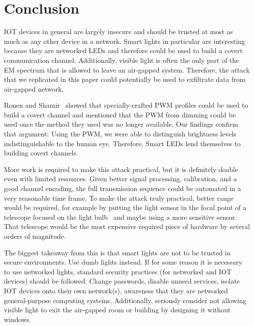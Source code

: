 \section{Conclusion} %
\label{sec:conclusion}

IOT devices in general are largely insecure and should be trusted at most as much as any other device in a network.
Smart lights in particular are interesting because they are networked LEDs and therefore could be used to build a covert communication channel.
Additionally, visible light is often the only part of the EM spectrum that is allowed to leave an air-gapped system.
Therefore, the attack that we replicated in this paper could potentially be used to exfiltrate data from air-gapped network.

Ronen and Shamir~\cite{Ronen:2016:EFAIDCSL} showed that specially-crafted PWM profiles could be used to build a covert channel and mentioned that the PWM from dimming could be used once the method they used was no longer available.
Our findings confirm that argument: Using the PWM, we were able to distinguish brightness levels indistinguishable to the human eye.
Therefore, Smart LEDs lend themselves to building covert channels.

More work is required to make this attack practical, but it is definitely doable even with limited resources.
Given better signal processing, calibration, and a good channel encoding, the full transmission sequence could be automated in a very reasonable time frame.
To make the attack truly practical, better range would be required, for example by putting the light sensor in the focal point of a telescope focused on the light bulb~\cite{Ronen:2016:EFAIDCSL} and maybe using a more sensitive sensor.
That telescope would be the most expensive required piece of hardware by several orders of magnitude.

The biggest takeaway from this is that smart lights are not to be trusted in secure environments. Use dumb lights instead.
If for some reason it is necessary to use networked lights, standard security practices (for networked and IOT devices) should be followed:
Change passwords, disable unused services, isolate IOT devices onto their own network(s), awareness that they are networked general-purpose computing systems.
Additionally, seriously consider not allowing visible light to exit the air-gapped room or building by designing it without windows.

